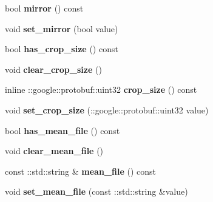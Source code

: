 \begin{DoxyCompactItemize}
bool {\bfseries mirror} () const
\item 
\mbox{\label{classcaffe_1_1_transformation_parameter_a0e266ff7468b2b0ba4c8918617aa4df3}} 
void {\bfseries set\+\_\+mirror} (bool value)
\item 
\mbox{\label{classcaffe_1_1_transformation_parameter_a4119a83b2ae58b89b0b64df912d06693}} 
bool {\bfseries has\+\_\+crop\+\_\+size} () const
\item 
\mbox{\label{classcaffe_1_1_transformation_parameter_a00bbae6421b94a8da3ab51d805ad36c5}} 
void {\bfseries clear\+\_\+crop\+\_\+size} ()
\item 
\mbox{\label{classcaffe_1_1_transformation_parameter_ae3e8a1a490d6e96dddc4945222e2deb7}} 
inline \+::google\+::protobuf\+::uint32 {\bfseries crop\+\_\+size} () const
\item 
\mbox{\label{classcaffe_1_1_transformation_parameter_af0dbaab7996f1942664bad0330931c8c}} 
void {\bfseries set\+\_\+crop\+\_\+size} (\+::google\+::protobuf\+::uint32 value)
\item 
\mbox{\label{classcaffe_1_1_transformation_parameter_a0ee303248135631fcfe282cd45994ae5}} 
bool {\bfseries has\+\_\+mean\+\_\+file} () const
\item 
\mbox{\label{classcaffe_1_1_transformation_parameter_a283a6e3d622d26eb76616ceda14f0be7}} 
void {\bfseries clear\+\_\+mean\+\_\+file} ()
\item 
\mbox{\label{classcaffe_1_1_transformation_parameter_a452a85fef3579062eb6c929c44892624}} 
const \+::std\+::string \& {\bfseries mean\+\_\+file} () const
\item 
\mbox{\label{classcaffe_1_1_transformation_parameter_a348f1fad3b2de130acc204d2b01c43f2}} 
void {\bfseries set\+\_\+mean\+\_\+file} (const \+::std\+::string \&value)
\item 

\end{DoxyCompactItemize}
